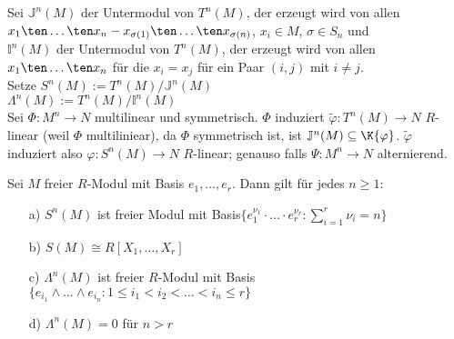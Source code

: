  \begin{Bew}
  Sei $\mathbb{J}^n(M)$ der Untermodul von $T^n(M)$, der erzeugt wird von allen 
  \\$x_1 \ten \dots \ten x_n -x_{\sigma(1)} \ten \dots \ten x_{\sigma(n)}$, $x_i \in M$, $ \sigma \in S_n$ und \\
  $\mathbb{I}^n(M)$ der Untermodul von $T^n(M)$, der erzeugt wird von allen
  $x_1 \ten \dots \ten x_n$ für die $x_i = x_j$ für ein Paar $(i,j)$ mit $i \neq j$.\\
  Setze $S^n(M) := T^n(M)/\mathbb{J}^n(M)$\\
  $\Lambda^n(M) := T^n(M)/\mathbb{I}^n(M)$ \\
  Sei $\Phi: M^n \rightarrow N$ multilinear und symmetrisch. $\Phi$ induziert 
  $\tilde{\varphi}:T^n(M) \rightarrow N$ $R$-linear (weil $\Phi$ multiliniear), da $\Phi$ symmetrisch ist, ist
  $\mathbb{J}^n(M) \subseteq \K{\varphi}$. $\tilde{\varphi}$ induziert also $\varphi:S^n(M) \rightarrow N$
  $R$-linear; genauso falls $\Psi : M^n \rightarrow N$ alternierend.
 \end{Bew}

 \begin{Prop}
  Sei $M$ freier $R$-Modul mit Basis $e_1, \dots, e_r$. Dann gilt für jedes $n \geq 1$:
  \begin{enumerate}
   \item[ a) ] $S^n(M)$ ist freier Modul mit Basis$\{e_1^{\nu_1} \cdot \dots \cdot e_r^{\nu_r}: \sum_{i=1}^{r}{\nu_i} =  n \}$
   \item[ b) ] $S(M) \cong R[X_1, \dots, X_r]$
   \item[ c) ] $\Lambda^n(M)$ ist freier $R$-Modul mit Basis \\
    $\{e_{i_1} \wedge \dots \wedge e_{i_n}: 1 \leq i_1 < i_2 < \dots < i_n \leq r \}$
   \item[ d) ] $\Lambda^n(M) = 0$ für $n > r$ 
  \end{enumerate}
 \end{Prop}
 
